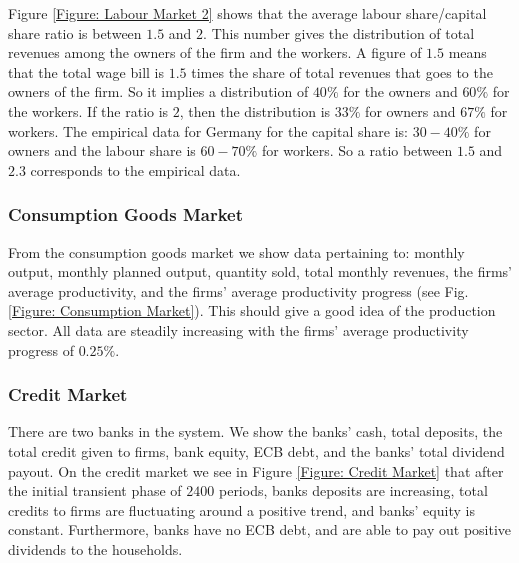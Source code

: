 Figure \ref{Figure: Labour Market 2} shows that the average labour share/capital share ratio is between $1.5$ and $2$. This number gives the distribution of total revenues among the owners of the firm and the workers. A figure of $1.5$ means that the total wage bill is $1.5$ times the share of total revenues that goes to the owners of the firm. So it implies a distribution of $40\%$ for the owners and $60\%$ for the workers. If the ratio is $2$, then the distribution is $33\%$ for owners and $67\%$ for workers. The empirical data for Germany for the capital share is: $30-40\%$ for owners and the labour share is $60-70\%$ for workers. So a ratio between $1.5$ and $2.3$ corresponds to the empirical data.

\subsubsection*{Consumption Goods Market}
From the consumption goods market we show data pertaining to: monthly output, monthly planned output, quantity sold, total monthly revenues,
the firms' average productivity, and the firms' average productivity progress (see Fig. \ref{Figure: Consumption Market}). This should give a good idea of the production sector. All data are steadily increasing with the firms' average productivity progress of $0.25\%$.

\subsubsection*{Credit Market}
There are two banks in the system. 
We show the banks' cash, total deposits, the total credit given to firms, bank equity, ECB debt, and the banks' total dividend payout.
On the credit market we see in Figure \ref{Figure: Credit Market} that after the initial transient phase of $2400$ periods, banks deposits are increasing, total credits to firms are fluctuating around a positive trend, and banks' equity is constant. Furthermore, banks have no ECB debt, and are able to pay out positive dividends to the households.

\begin{comment}
\section{Tax rate scenarios}
As a first sensitivity analysis we consider a variation in the income tax rate from $1-8\%$ and $10,15,20\%$, see Figure \ref{Figure: scenarios}.
We show results for $20$ batch runs, $4000$ periods each, for each value of the tax rate parameter.
It appears that the GDP growth rate, the unemployment rate and the investment/GDP ratio are not very sensitive to increases in the tax rate.
\end{comment}


%

%

